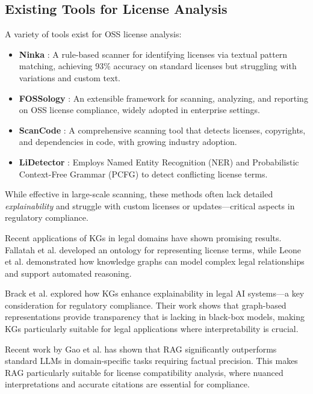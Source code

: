 \documentclass[9pt,twocolumn]{article}
\begin{document}
\subsection{Existing Tools for License Analysis}
A variety of tools exist for OSS license analysis:
\begin{itemize}
    \item \textbf{Ninka} \cite{german2010sentence}: A rule-based scanner for identifying licenses via textual pattern matching, achieving 93\% accuracy on standard licenses but struggling with variations and custom text.
    \item \textbf{FOSSology} \cite{fossology}: An extensible framework for scanning, analyzing, and reporting on OSS license compliance, widely adopted in enterprise settings.
    \item \textbf{ScanCode} \cite{scancode}: A comprehensive scanning tool that detects licenses, copyrights, and dependencies in code, with growing industry adoption.
    \item \textbf{LiDetector} \cite{LiDetectorPaper}: Employs Named Entity Recognition (NER) and Probabilistic Context-Free Grammar (PCFG) to detect conflicting license terms.
\end{itemize}
While effective in large-scale scanning, these methods often lack detailed \emph{explainability} and struggle with custom licenses or updates—critical aspects in regulatory compliance.

Recent applications of KGs in legal domains have shown promising results. Fallatah et al. \cite{fallatah2020ontology} developed an ontology for representing license terms, while Leone et al. \cite{leone2020legal} demonstrated how knowledge graphs can model complex legal relationships and support automated reasoning.

Brack et al. \cite{brack2021knowledge} explored how KGs enhance explainability in legal AI systems—a key consideration for regulatory compliance. Their work shows that graph-based representations provide transparency that is lacking in black-box models, making KGs particularly suitable for legal applications where interpretability is crucial.

Recent work by Gao et al. \cite{gao2023retrieval} has shown that RAG significantly outperforms standard LLMs in domain-specific tasks requiring factual precision. This makes RAG particularly suitable for license compatibility analysis, where nuanced interpretations and accurate citations are essential for compliance.
\end{document}
